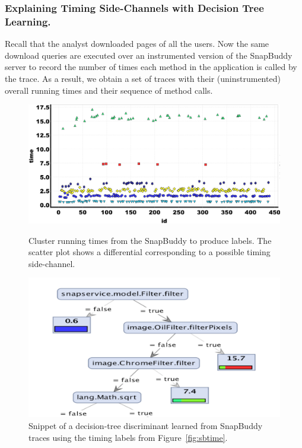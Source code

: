 \documentclass{article}
\begin{document}
\subsubsection*{Explaining Timing Side-Channels with Decision Tree Learning.}
Recall that the analyst downloaded pages
of all the users. Now the same download queries are executed over an
instrumented version of the SnapBuddy server to record the number of
times each method in the application is called by the trace. As a
result, we obtain a
set of traces with their (uninstrumented) overall running times and their
sequence of method calls.

\begin{figure}[t]
\centering
\begin{minipage}[b]{0.47\textwidth}
  \centering
  \includegraphics[width=\textwidth]{SnapBuddy_scatter_2}
  \caption{Cluster running times from the SnapBuddy to produce labels. The scatter plot shows a differential corresponding to a possible timing side-channel.}
  \label{fig:sbtime}
\end{minipage}\hfill
\begin{minipage}[b]{0.50\textwidth}
  \centering
  \includegraphics[width=\textwidth]{SnapBuddy_DecisionTree_1}
  \caption{Snippet of a decision-tree discriminant learned from SnapBuddy traces using the timing labels from Figure~\ref{fig:sbtime}.}
  \label{fig:sbdectree}
\end{minipage}
\vspace{-2em}
\end{figure}
\end{document}
